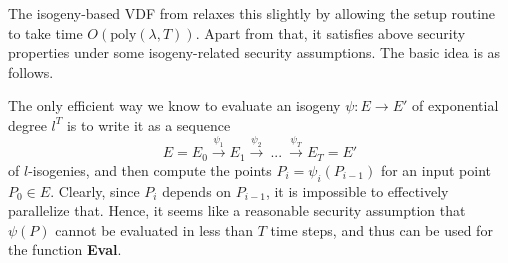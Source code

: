 The isogeny-based VDF from \cite{verifiable_delay_function} relaxes this slightly by allowing the setup routine to take time $O(\mathrm{poly}(\lambda, T))$.
Apart from that, it satisfies above security properties under some isogeny-related security assumptions.
The basic idea is as follows.

The only efficient way we know to evaluate an isogeny $\psi: E \to E'$ of exponential degree $l^T$ is to write it as a sequence
\begin{equation*}
    E = E_0 \overset{\psi_1}{\longrightarrow} E_1 \overset{\psi_2}{\longrightarrow} \ ... \ \overset{\psi_T}{\longrightarrow} E_T = E'
\end{equation*}
of $l$-isogenies, and then compute the points $P_i = \psi_i(P_{i - 1})$ for an input point $P_0 \in E$.
Clearly, since $P_i$ depends on $P_{i - 1}$, it is impossible to effectively parallelize that.
Hence, it seems like a reasonable security assumption that $\psi(P)$ cannot be evaluated in less than $T$ time steps, and thus can be used for the function \textbf{Eval}.

